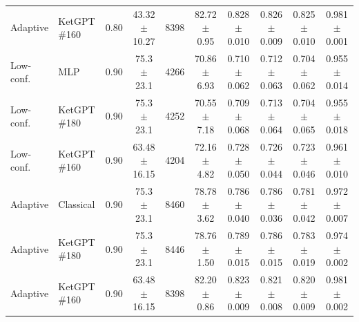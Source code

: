 \begin{table}[t]
\begin{tabular}{llcccccccc}
Adaptive & KetGPT \#160 & 0.80 & 43.32 $\pm$ 10.27 & 8398 & 82.72 $\pm$ 0.95 & 0.828 $\pm$ 0.010 & 0.826 $\pm$ 0.009 & 0.825 $\pm$ 0.010 & 0.981 $\pm$ 0.001 \\
Low-conf. & MLP & 0.90 & 75.3 $\pm$ 23.1 & 4266 & 70.86 $\pm$ 6.93 & 0.710 $\pm$ 0.062 & 0.712 $\pm$ 0.063 & 0.704 $\pm$ 0.062 & 0.955 $\pm$ 0.014 \\
Low-conf. & KetGPT \#180 & 0.90 & 75.3 $\pm$ 23.1 & 4252 & 70.55 $\pm$ 7.18 & 0.709 $\pm$ 0.068 & 0.713 $\pm$ 0.064 & 0.704 $\pm$ 0.065 & 0.955 $\pm$ 0.018 \\
Low-conf. & KetGPT \#160 & 0.90 & 63.48 $\pm$ 16.15 & 4204 & 72.16 $\pm$ 4.82 & 0.728 $\pm$ 0.050 & 0.726 $\pm$ 0.044 & 0.723 $\pm$ 0.046 & 0.961 $\pm$ 0.010 \\
Adaptive & Classical & 0.90 & 75.3 $\pm$ 23.1 & 8460 & 78.78 $\pm$ 3.62 & 0.786 $\pm$ 0.040 & 0.786 $\pm$ 0.036 & 0.781 $\pm$ 0.042 & 0.972 $\pm$ 0.007 \\
Adaptive & KetGPT \#180 & 0.90 & 75.3 $\pm$ 23.1 & 8446 & 78.76 $\pm$ 1.50 & 0.789 $\pm$ 0.015 & 0.786 $\pm$ 0.015 & 0.783 $\pm$ 0.019 & 0.974 $\pm$ 0.002 \\
Adaptive & KetGPT \#160 & 0.90 & 63.48 $\pm$ 16.15 & 8398 & 82.20 $\pm$ 0.86 & 0.823 $\pm$ 0.009 & 0.821 $\pm$ 0.008 & 0.820 $\pm$ 0.009 & 0.981 $\pm$ 0.002 \\
\bottomrule
\end{tabular}
\end{table}
